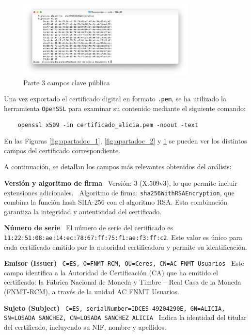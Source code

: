 \begin{figure}[H]
    \centering
    \includegraphics[width=0.8\textwidth]{apartadoc_3.png}
    \caption{Parte 3 campos clave pública}
    \label{fig:apartadoc_3}
\end{figure}

Una vez exportado el certificado digital en formato \texttt{.pem}, se ha utilizado la herramienta \texttt{OpenSSL} para examinar su contenido mediante el siguiente comando:


\begin{verbatim}
    openssl x509 -in certificado_alicia.pem -noout -text
\end{verbatim}



En las Figuras \ref{fig:apartadoc_1}, \ref{fig:apartadoc_2} y \ref{fig:apartadoc_3} se pueden ver los distintos campos del certificado correspondiente.

A continuación, se detallan los campos más relevantes obtenidos del análisis:

\textbf{Versión y algoritmo de firma} \ Versión: 3 (X.509v3), lo que permite incluir extensiones adicionales. \ Algoritmo de firma: \texttt{sha256WithRSAEncryption}, que combina la función hash SHA-256 con el algoritmo RSA. Esta combinación garantiza la integridad y autenticidad del certificado.

\textbf{Número de serie} \ El número de serie del certificado es \texttt{11:22:51:08:ae:14:ec:78:67:ff:75:f1:ae:f3:ff:c2}. Este valor es único para cada certificado emitido por la autoridad certificadora y permite su identificación.

\textbf{Emisor (Issuer)} \ \texttt{C=ES, O=FNMT-RCM, OU=Ceres, CN=AC FNMT Usuarios} \ Este campo identifica a la Autoridad de Certificación (CA) que ha emitido el certificado: la Fábrica Nacional de Moneda y Timbre – Real Casa de la Moneda (FNMT-RCM), a través de la unidad AC FNMT Usuarios.

\textbf{Sujeto (Subject)} \ \texttt{C=ES, serialNumber=IDCES-49204290E, GN=ALICIA, SN=LOSADA SANCHEZ, CN=LOSADA SANCHEZ ALICIA} \ Indica la identidad del titular del certificado, incluyendo su NIF, nombre y apellidos.

